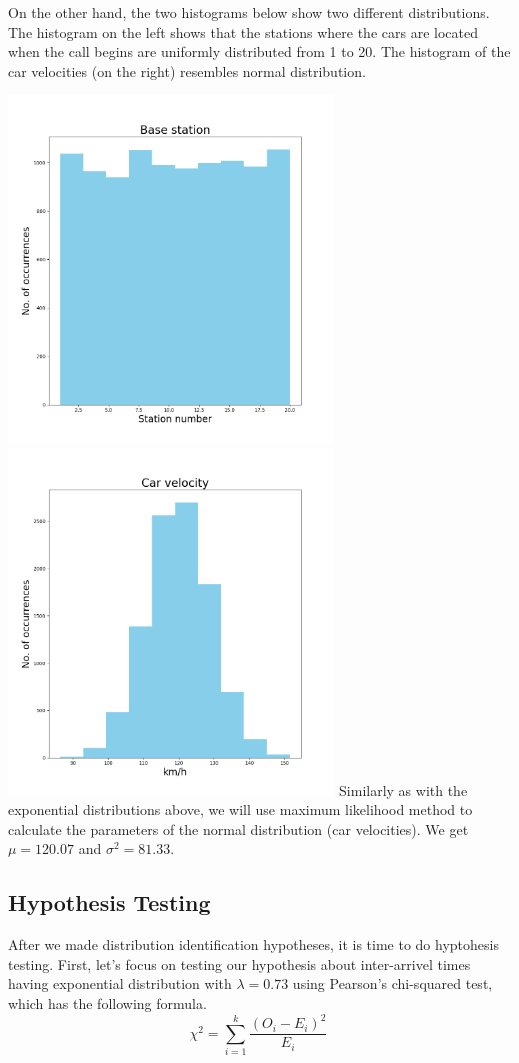 \documentclass[12pt,a4paper]{article}
\begin{document}
\pagebreak
On the other hand, the two histograms below show two different distributions. The histogram on the left shows that the stations where the cars are located when the call begins are uniformly distributed from 1 to 20. The histogram of the car velocities (on the right) resembles normal distribution.\par
\noindent \includegraphics[width=3.4in]{Figure_2}
\includegraphics[width=3.4in]{Figure_4}
Similarly as with the exponential distributions above, we will use maximum likelihood method to calculate the parameters of the normal distribution (car velocities). We get $\mu=120.07$ and $\sigma^2=81.33$.

\subsection{Hypothesis Testing}
After we made distribution identification hypotheses, it is time to do hyptohesis testing. First, let's focus on testing our hypothesis about inter-arrivel times having exponential distribution with $\lambda=0.73$ using Pearson's chi-squared test, which has the following formula.
\begin{equation} {\chi}^2=\sum_{i=1}^{k} \frac{(O_i - E_i)^2}{E_i}\ \end{equation}
\end{document}

